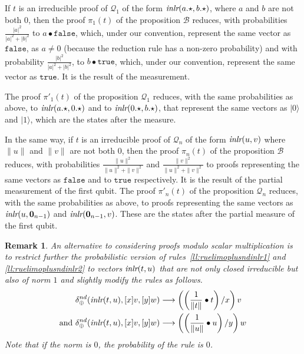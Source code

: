 \documentclass[screen, sigconf,authorversion,nonacm]{acmart}
\theoremstyle{acmdefinition}
\newtheorem{remark}[theorem]{Remark}}
\numberwithin{equation}{section}
\newcommand\ket[1]{\ensuremath{|{#1}\rangle}}
\newcommand\abstr[1]{[#1]}
\newcommand\inlr{\mbox{\it inlr}}
\newcommand\Q{{\mathcal Q}}
\newcommand\B{{\mathcal B}}
\newcommand\boolzero{{\mathtt{false}}}
\newcommand\boolone{{\mathtt{true}}}
\newcommand\elimplus{\delta_{\oplus}}
\begin{document}
If $t$ is an irreducible proof of $\Q_1$ of the form
$\inlr(a.\star,b.\star)$, where $a$ and $b$ are not both $0$, then the
proof $\pi_1(t)$ of the proposition $\B$ reduces, with probabilities
$\tfrac{|a|^2}{|a|^2 + |b|^2}$ to $a\bullet\boolzero$, which, under our
convention, represent the same vector as $\boolzero$, as $a \neq 0$
(because the reduction rule has a non-zero probability) and with
probability $\tfrac{|b|^2}{|a|^2 + |b|^2}$, to $b\bullet\boolone$, which,
under our convention, represent the same vector as $\boolone$.  It is
the result of the measurement.

The proof $\pi'_1(t)$ of the proposition $\Q_1$ reduces, with the same
probabilities as above, to $\inlr(a . \star,0 . \star)$ and to
$\inlr(0 . \star,b . \star)$, that represent the same vectors as $\ket
0$ and $\ket 1$, which are the states after the measure.


In the same way, if $t$ is an irreducible proof of $\Q_n$ of the form
$\inlr(u,v)$ where $\|u\|$ and $\|v\|$ are not both $0$, then the
proof $\pi_n(t)$ of the proposition $\B$ reduces, with probabilities
$\tfrac{\|u\|^2}{\|u\|^2 + \|v\|^2}$ and $\tfrac{\|v\|^2}{\|u\|^2 +
  \|v\|^2}$ to proofs representing the same vectors as $\boolzero$ and
to $\boolone$ respectively.  It is the result of the partial
measurement of the first qubit.  The proof $\pi'_n(t)$ of the
proposition $\Q_n$ reduces, with the same probabilities as above, to
proofs representing the same vectors as $\inlr(u,{\bf 0}_{n-1})$ and
$\inlr({\bf 0}_{n-1},v)$.  These are the states after the partial
measure of the first qubit.

\begin{remark}
An alternative to considering proofs modulo scalar multiplication is
to restrict further the probabilistic version of
rules~\eqref{ll:ruelimoplusndinlr1} and \eqref{ll:ruelimoplusndinlr2}
to vectors $\inlr(t,u)$ that are not only closed irreducible but also
of norm $1$ and slightly modify the rules as follows.
\begin{align*}
     \elimplus^{nd}(\inlr(t,u),\abstr{x}v,\abstr{y}w) & \longrightarrow  \left(\left(\frac{1}{\|t\|}\bullet t\right)/x\right)v
     \\
    \mbox{and}~\elimplus^{nd}(\inlr(t,u),\abstr{x}v,\abstr{y}w) & \longrightarrow
    \left(\left(\frac{1}{\|u\|}\bullet u\right)/y\right)w 
\end{align*}
Note that if the norm is $0$, the probability of the rule is $0$.
\end{remark}
\end{document}
